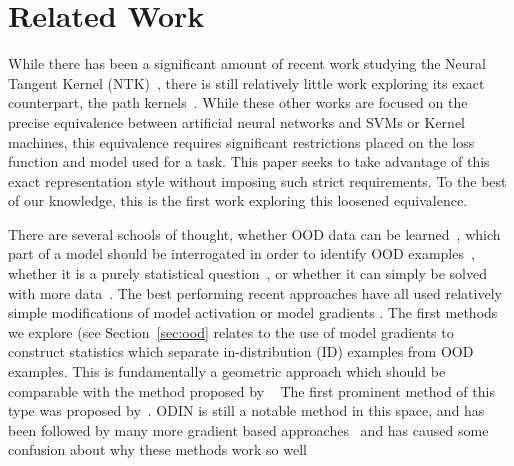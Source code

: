 
\section{Related Work}
While there has been a significant amount of recent work studying the Neural Tangent Kernel (NTK)~\citep{jacot2018neural}, there is still relatively little work exploring its exact counterpart, the path kernels~\citep{bell2023, chen2021equivalence, domingos2020}. While these other works are focused on the precise equivalence between artificial neural networks and SVMs or Kernel machines, this equivalence requires significant restrictions placed on the loss function and model used for a task. This paper seeks to take advantage of this exact representation style without imposing such strict requirements. To the best of our knowledge, this is the first work exploring this loosened equivalence. 


There are several schools of thought, whether OOD data can be learned~\citep{huang2021scaling, mohseni2020, he2015, pillai2013classification, fumera2002}, which part of a model should be interrogated in order to identify OOD examples~\citep{liu2020, lin2021}, whether it is a purely statistical question~\citep{lee2018}, or whether it can simply be solved with more data~\citep{chen2021atom, de_silva_value_2023}. The best performing recent approaches have all used relatively simple modifications of model activation or model gradients \citep{djurisic2023extremely, xu2023vra, sun2022, sun2021}. The first methods we explore (see Section~\ref{sec:ood} relates to the use of model gradients to construct statistics which separate in-distribution (ID) examples from OOD examples. This is fundamentally a geometric approach which should be comparable with the method proposed by \citet{sun2022deep}~\citep{gillette2022data} The first prominent method of this type was proposed by~\citet{liang2018}. ODIN is still a notable method in this space, and has been followed by many more gradient based approaches~\citep{behpour2023, huang2021gradients} and has caused some confusion about why these methods work so well~\citep{igoe2022}

